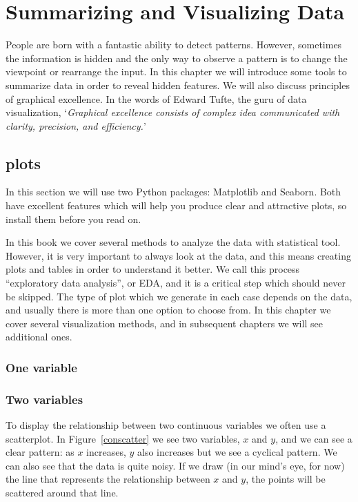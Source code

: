 \chapter{Summarizing and Visualizing Data}
\hypertarget{EDA}{%
People are born with a fantastic ability to detect patterns. However, sometimes the
information is hidden and the only way to observe a pattern is to change
the viewpoint or rearrange the input. In this chapter we will introduce some tools
to summarize data in order to reveal hidden features. We will also discuss principles of
graphical excellence. In the words of Edward Tufte, the guru of data visualization,
`\textit{Graphical excellence consists of complex idea communicated with clarity, precision,
and efficiency.}'
}


\section{plots}
In this section we will use two Python packages: Matplotlib and Seaborn. Both have excellent features which will help you produce clear and attractive plots, so install them before you read on.

In this book we cover several methods to analyze the data with statistical tool. However, it is very important to always look at the data, and this means creating plots and tables in order to understand it better. We call this process ``exploratory data analysis'', or EDA, and it is a critical step which should never be skipped. The type of plot which we generate in each case depends on the data, and usually there is more than one option to choose from. In this chapter we cover several visualization methods, and in subsequent chapters we will see additional ones.

\subsection{One variable}

\subsection{Two variables}

To display the relationship between two continuous variables we often use a scatterplot. In Figure~\ref{conscatter} we see two variables, $x$ and $y$, and we can see a clear pattern: as $x$ increases, $y$ also increases but we see a cyclical pattern. We can also see that the data is quite noisy. If we draw (in our mind's eye, for now) the line that represents the relationship between $x$ and $y$, the points will be scattered around that line.

